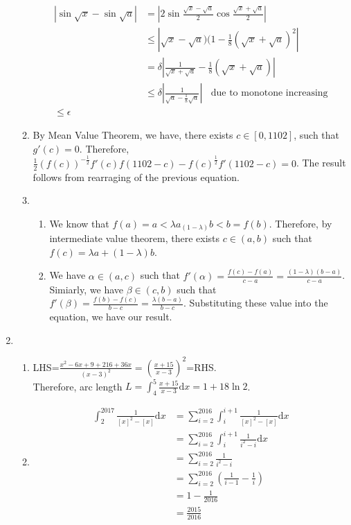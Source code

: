 \documentclass[12pt]{article}
\newcommand{\diff}{\mathrm{d}}
\theoremstyle{definition}
\begin{document}
\begin{enumerate}
\begin{enumerate}
\begin{align*}
    |\sin\sqrt{x}-\sin\sqrt{a}|&=|2\sin\frac{\sqrt{x}-\sqrt{a}}{2}\cos\frac{\sqrt{x}+\sqrt{a}}{2}|\\
    &\leq |\sqrt{x}-\sqrt{a})(1-\frac{1}{8}(\sqrt{x}+\sqrt{a})^2|\\
    &=\delta|\frac{1}{\sqrt{x}+\sqrt{a}}-\frac{1}{8}(\sqrt{x}+\sqrt{a})|\\
    &\leq \delta |\frac{1}{\sqrt{a}-\frac{1}{8}\sqrt{a}}|\;\;\text{ due to monotone increasing}\\
    \leq \epsilon
    \end{align*}
    \item By Mean Value Theorem, we have, there exists $c\in[0,1102]$, such that $g'(c)=0$. Therefore, $\frac{1}{2}(f(c))^{-\frac{1}{2}}f'(c)f(1102-c)-f(c)^\frac{1}{2}f'(1102-c)=0$. The result follows from rearraging of the previous equation.
    \item\begin{enumerate}
      \item We know that $f(a)=a<\lambda a_(1-\lambda) b<b=f(b)$. Therefore, by intermediate value theorem, there exists $c\in(a,b)$ such that $f(c)=\lambda a+(1-\lambda)b$.
      \item We have $\alpha\in(a,c)$ such that $f'(\alpha)=\frac{f(c)-f(a)}{c-a}=\frac{(1-\lambda)(b-a)}{c-a}$. Simiarly, we have $\beta\in(c,b)$ such that $f'(\beta)=\frac{f(b)-f(c)}{b-c}=\frac{\lambda(b-a)}{b-c}$. Substituting these value into the equation, we have our result.
    \end{enumerate}
  \end{enumerate}
  \item\begin{enumerate}
    \item LHS=$\frac{x^2-6x+9+216+36x}{(x-3)^2}=\left(\frac{x+15}{x-3}\right)^2$=RHS.\\Therefore, arc length $L=\int_4^5 \frac{x+15}{x-3}\diff x =1+18\ln2$.
    \item 
    \begin{align*}
    \int_2^{2017}\frac{1}{[x]^2-[x]}\diff x &=\sum_{i=2}^{2016}\int_i^{i+1}\frac{1}{[x]^2-[x]}\diff x\\
    &=\sum_{i=2}^{2016}\int_i^{i+1}\frac{1}{i^2-i}\diff x\\
    &=\sum_{i=2}^{2016} \frac{1}{i^2-i}\\
    &=\sum_{i=2}^{2016} \left(\frac{1}{i-1}-\frac{1}{i}\right)\\
    &=1-\frac{1}{2016}\\
    &=\frac{2015}{2016}
    \end{align*}

\end{enumerate}
\end{enumerate}
\end{document}
